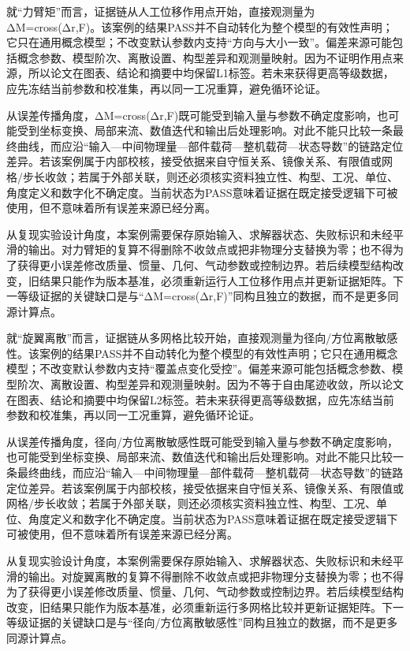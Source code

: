 \documentclass[UTF8,12pt,openany]{ctexbook}
\begin{document}
就“力臂矩”而言，证据链从人工位移作用点开始，直接观测量为ΔM=cross(Δr,F)。该案例的结果PASS并不自动转化为整个模型的有效性声明；它只在通用概念模型；不改变默认参数内支持“方向与大小一致”。偏差来源可能包括概念参数、模型阶次、离散设置、构型差异和观测量映射。因为不证明作用点来源，所以论文在图表、结论和摘要中均保留L1标签。若未来获得更高等级数据，应先冻结当前参数和校准集，再以同一工况重算，避免循环论证。

从误差传播角度，ΔM=cross(Δr,F)既可能受到输入量与参数不确定度影响，也可能受到坐标变换、局部来流、数值迭代和输出后处理影响。对此不能只比较一条最终曲线，而应沿“输入—中间物理量—部件载荷—整机载荷—状态导数”的链路定位差异。若该案例属于内部校核，接受依据来自守恒关系、镜像关系、有限值或网格/步长收敛；若属于外部关联，则还必须核实资料独立性、构型、工况、单位、角度定义和数字化不确定度。当前状态为PASS意味着证据在既定接受逻辑下可被使用，但不意味着所有误差来源已经分离。

从复现实验设计角度，本案例需要保存原始输入、求解器状态、失败标识和未经平滑的输出。对力臂矩的复算不得删除不收敛点或把非物理分支替换为零；也不得为了获得更小误差修改质量、惯量、几何、气动参数或控制边界。若后续模型结构改变，旧结果只能作为版本基准，必须重新运行人工位移作用点并更新证据矩阵。下一等级证据的关键缺口是与“ΔM=cross(Δr,F)”同构且独立的数据，而不是更多同源计算点。

就“旋翼离散”而言，证据链从多网格比较开始，直接观测量为径向/方位离散敏感性。该案例的结果PASS并不自动转化为整个模型的有效性声明；它只在通用概念模型；不改变默认参数内支持“覆盖点变化受控”。偏差来源可能包括概念参数、模型阶次、离散设置、构型差异和观测量映射。因为不等于自由尾迹收敛，所以论文在图表、结论和摘要中均保留L2标签。若未来获得更高等级数据，应先冻结当前参数和校准集，再以同一工况重算，避免循环论证。

从误差传播角度，径向/方位离散敏感性既可能受到输入量与参数不确定度影响，也可能受到坐标变换、局部来流、数值迭代和输出后处理影响。对此不能只比较一条最终曲线，而应沿“输入—中间物理量—部件载荷—整机载荷—状态导数”的链路定位差异。若该案例属于内部校核，接受依据来自守恒关系、镜像关系、有限值或网格/步长收敛；若属于外部关联，则还必须核实资料独立性、构型、工况、单位、角度定义和数字化不确定度。当前状态为PASS意味着证据在既定接受逻辑下可被使用，但不意味着所有误差来源已经分离。

从复现实验设计角度，本案例需要保存原始输入、求解器状态、失败标识和未经平滑的输出。对旋翼离散的复算不得删除不收敛点或把非物理分支替换为零；也不得为了获得更小误差修改质量、惯量、几何、气动参数或控制边界。若后续模型结构改变，旧结果只能作为版本基准，必须重新运行多网格比较并更新证据矩阵。下一等级证据的关键缺口是与“径向/方位离散敏感性”同构且独立的数据，而不是更多同源计算点。
\end{document}

